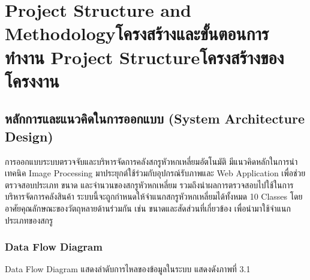 \chapter{\ifproject%
      \ifenglish Project Structure and Methodology\else โครงสร้างและขั้นตอนการทำงาน\fi
  \else%
      \ifenglish Project Structure\else โครงสร้างของโครงงาน\fi
  \fi}

\section{หลักการและแนวคิดในการออกแบบ (System Architecture Design)}

การออกแบบระบบตรวจจับและบริหารจัดการคลังสกรูหัวหกเหลี่ยมอัตโนมัติ มีแนวคิดหลักในการนำเทคนิค Image Processing มาประยุกต์ใช้ร่วมกับอุปกรณ์รับภาพและ Web Application เพื่อช่วยตรวจสอบประเภท ขนาด และจำนวนของสกรูหัวหกเหลี่ยม รวมถึงนำผลการตรวจสอบไปใช้ในการบริหารจัดการคลังสินค้า ระบบนี้จะถูกกำหนดให้จำแนกสกรูหัวหกเหลี่ยมได้ทั้งหมด 10 Classes โดยอาศัยคุณลักษณะของวัตถุหลายด้านร่วมกัน เช่น ขนาดและสัดส่วนที่เกี่ยวข้อง เพื่อนำมาใช้จำแนกประเภทของสกรู

\subsection{Data Flow Diagram}

Data Flow Diagram แสดงลำดับการไหลของข้อมูลในระบบ แสดงดังภาพที่ 3.1

